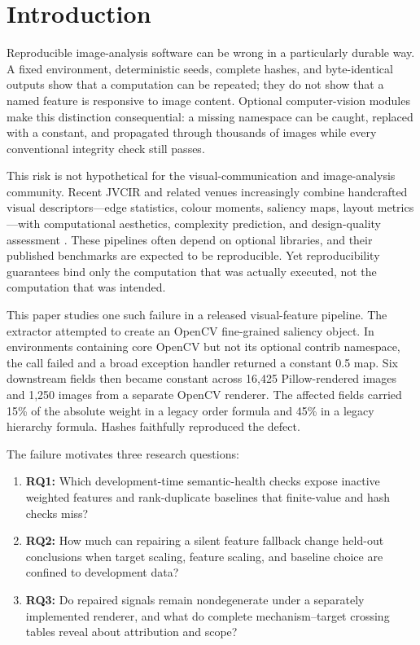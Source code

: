 \section{Introduction}

Reproducible image-analysis software can be wrong in a particularly durable way. A fixed environment, deterministic seeds, complete hashes, and byte-identical outputs show that a computation can be repeated; they do not show that a named feature is responsive to image content. Optional computer-vision modules make this distinction consequential: a missing namespace can be caught, replaced with a constant, and propagated through thousands of images while every conventional integrity check still passes.

This risk is not hypothetical for the visual-communication and image-analysis community. Recent JVCIR and related venues increasingly combine handcrafted visual descriptors---edge statistics, colour moments, saliency maps, layout metrics---with computational aesthetics, complexity prediction, and design-quality assessment \citep{guo2026dual,yang2024selfsupervised,yan2024hybrid}. These pipelines often depend on optional libraries, and their published benchmarks are expected to be reproducible. Yet reproducibility guarantees bind only the computation that was actually executed, not the computation that was intended.

This paper studies one such failure in a released visual-feature pipeline. The extractor attempted to create an OpenCV fine-grained saliency object. In environments containing core OpenCV but not its optional contrib namespace, the call failed and a broad exception handler returned a constant 0.5 map. Six downstream fields then became constant across 16,425 Pillow-rendered images and 1,250 images from a separate OpenCV renderer. The affected fields carried 15\% of the absolute weight in a legacy order formula and 45\% in a legacy hierarchy formula. Hashes faithfully reproduced the defect.

The failure motivates three research questions:
\begin{enumerate}
    \item \textbf{RQ1:} Which development-time semantic-health checks expose inactive weighted features and rank-duplicate baselines that finite-value and hash checks miss?
    \item \textbf{RQ2:} How much can repairing a silent feature fallback change held-out conclusions when target scaling, feature scaling, and baseline choice are confined to development data?
    \item \textbf{RQ3:} Do repaired signals remain nondegenerate under a separately implemented renderer, and what do complete mechanism--target crossing tables reveal about attribution and scope?
\end{enumerate}

